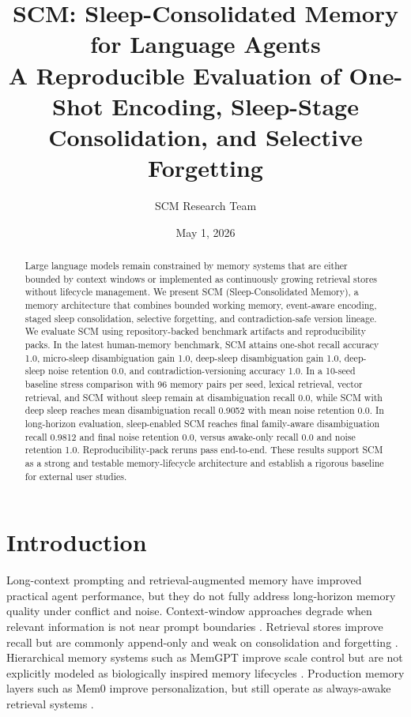 \documentclass[11pt,a4paper]{article}
\title{SCM: Sleep-Consolidated Memory for Language Agents\\
\large A Reproducible Evaluation of One-Shot Encoding, Sleep-Stage Consolidation, and Selective Forgetting}
\author{SCM Research Team}
\date{May 1, 2026}
\begin{document}
\maketitle

\begin{abstract}
Large language models remain constrained by memory systems that are either bounded by context windows or implemented as continuously growing retrieval stores without lifecycle management. We present SCM (Sleep-Consolidated Memory), a memory architecture that combines bounded working memory, event-aware encoding, staged sleep consolidation, selective forgetting, and contradiction-safe version lineage. We evaluate SCM using repository-backed benchmark artifacts and reproducibility packs. In the latest human-memory benchmark, SCM attains one-shot recall accuracy 1.0, micro-sleep disambiguation gain 1.0, deep-sleep disambiguation gain 1.0, deep-sleep noise retention 0.0, and contradiction-versioning accuracy 1.0. In a 10-seed baseline stress comparison with 96 memory pairs per seed, lexical retrieval, vector retrieval, and SCM without sleep remain at disambiguation recall 0.0, while SCM with deep sleep reaches mean disambiguation recall 0.9052 with mean noise retention 0.0. In long-horizon evaluation, sleep-enabled SCM reaches final family-aware disambiguation recall 0.9812 and final noise retention 0.0, versus awake-only recall 0.0 and noise retention 1.0. Reproducibility-pack reruns pass end-to-end. These results support SCM as a strong and testable memory-lifecycle architecture and establish a rigorous baseline for external user studies.
\end{abstract}

\section{Introduction}
Long-context prompting and retrieval-augmented memory have improved practical agent performance, but they do not fully address long-horizon memory quality under conflict and noise. Context-window approaches degrade when relevant information is not near prompt boundaries \cite{liu2023lost}. Retrieval stores improve recall but are commonly append-only and weak on consolidation and forgetting \cite{lewis2020retrieval}. Hierarchical memory systems such as MemGPT improve scale control but are not explicitly modeled as biologically inspired memory lifecycles \cite{packer2023memgpt}. Production memory layers such as Mem0 improve personalization, but still operate as always-awake retrieval systems \cite{chhikara2025mem0}.
\end{document}
